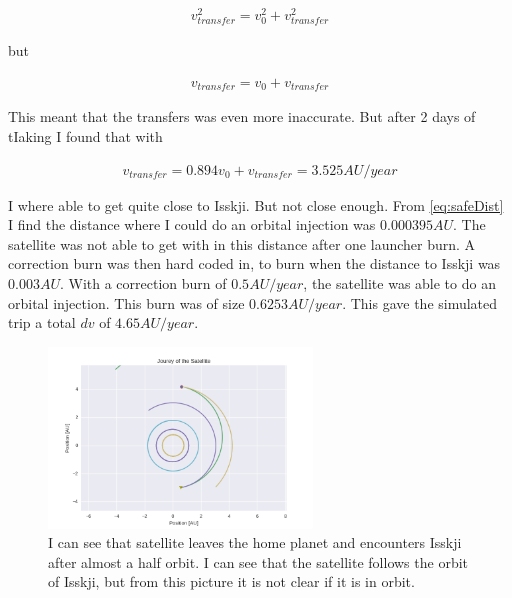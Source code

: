 \documentclass[a4paper, 10pt]{article}
\begin{document}
\begin{align}
v_{transfer}^2 = v_0^2 + v_{transfer}^2
\end{align}  

but

\begin{align}
v_{transfer} = v_0 + v_{transfer}
\end{align} 

This meant that the transfers was even more inaccurate. But after 2 days of tIaking I found that with 

\begin{align}
v_{transfer} = 0.894v_0 + v_{transfer} = 3.525 AU/year
\end{align} 

I where able to get quite close to Isskji. But not close enough. From \ref{eq:safeDist} I find the distance where I could do an orbital injection was $0.000395 AU$. The satellite was not able to get with in this distance after one launcher burn. A correction burn was then hard coded in, to burn when the distance to Isskji was $0.003 AU$. With a correction burn of $0.5 AU/year$, the satellite was able to do an orbital injection. This burn was of size $0.6253 AU/year$. This gave the simulated trip a total $dv$ of $4.65 AU/year$.\\

\begin{figure}[H]
\centering
\includegraphics[width = 70mm]{part3SatOrb.png}
\caption{I can see that satellite leaves the home planet and encounters Isskji after almost a half orbit. I can see that the satellite follows the orbit of Isskji, but from this picture it is not clear if it is in orbit.}
\end{figure}
\end{document}
